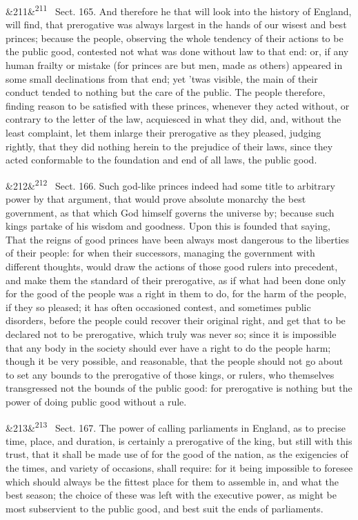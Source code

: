 \documentclass[12pt]{article}
\newcommand{\para}[1][]{\par\noindent\ifx&#1&\else\textsuperscript{\footnotesize #1}~\fi}
\begin{document}
\para[211] Sect. 165. And therefore he that will look into the history of England, will find, that prerogative was always largest in the hands of our wisest and best princes; because the people, observing the whole tendency of their actions to be the public good, contested not what was done without law to that end: or, if any human frailty or mistake (for princes are but men, made as others) appeared in some small declinations from that end; yet 'twas visible, the main of their conduct tended to nothing but the care of the public. The people therefore, finding reason to be satisfied with these princes, whenever they acted without, or contrary to the letter of the law, acquiesced in what they did, and, without the least complaint, let them inlarge their prerogative as they pleased, judging rightly, that they did nothing herein to the prejudice of their laws, since they acted conformable to the foundation and end of all laws, the public good.

\para[212] Sect. 166. Such god-like princes indeed had some title to arbitrary power by that argument, that would prove absolute monarchy the best government, as that which God himself governs the universe by; because such kings partake of his wisdom and goodness. Upon this is founded that saying, That the reigns of good princes have been always most dangerous to the liberties of their people: for when their successors, managing the government with different thoughts, would draw the actions of those good rulers into precedent, and make them the standard of their prerogative, as if what had been done only for the good of the people was a right in them to do, for the harm of the people, if they so pleased; it has often occasioned contest, and sometimes public disorders, before the people could recover their original right, and get that to be declared not to be prerogative, which truly was never so; since it is impossible that any body in the society should ever have a right to do the people harm; though it be very possible, and reasonable, that the people should not go about to set any bounds to the prerogative of those kings, or rulers, who themselves transgressed not the bounds of the public good: for prerogative is nothing but the power of doing public good without a rule.

\para[213] Sect. 167. The power of calling parliaments in England, as to precise time, place, and duration, is certainly a prerogative of the king, but still with this trust, that it shall be made use of for the good of the nation, as the exigencies of the times, and variety of occasions, shall require: for it being impossible to foresee which should always be the fittest place for them to assemble in, and what the best season; the choice of these was left with the executive power, as might be most subservient to the public good, and best suit the ends of parliaments.
\end{document}
